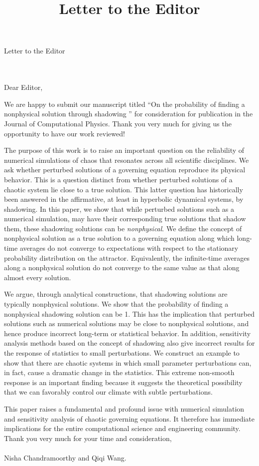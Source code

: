 \documentclass{letter}
\title{Letter to the Editor}
\begin{document}
\hspace{1.6in} 
\begin{large}{Letter to the Editor}\end{large}
\\
\\
Dear Editor,

We are happy to submit our manuscript titled 
``On the probability of finding a nonphysical solution through shadowing ''
for consideration for publication in the Journal of Computational Physics. Thank you very much for giving us the 
opportunity to have our work reviewed!

The purpose of this work is to raise an important question on the reliability of numerical simulations of chaos that resonates across all scientific disciplines. We ask whether perturbed solutions of a 
governing equation reproduce its physical behavior. This is a question distinct from whether perturbed solutions of a chaotic system lie close to a true solution. This latter question has historically been answered in the affirmative, at least in hyperbolic dynamical systems, by shadowing. In this paper, we show that while
perturbed solutions such as a numerical simulation, 
may have their corresponding true solutions that shadow them, these shadowing solutions can be \emph{nonphysical}. We define the concept of nonphysical solution as a true solution to a governing equation along which long-time averages do not converge to expectations with respect to the stationary probability distribution on the attractor. Equivalently, the infinite-time averages along a nonphysical solution do not converge to the same value as that along almost every solution.

We argue, through analytical constructions, that shadowing solutions are typically nonphysical solutions. We show that the probability of finding a nonphysical shadowing solution can be 1. This has the implication that perturbed solutions such as numerical solutions may be close to nonphysical solutions, and hence produce incorrect long-term or statistical behavior. In addition, sensitivity analysis methods based on the concept of shadowing also give incorrect results for the response of statistics to small perturbations. We construct an example to show that 
there are chaotic systems in which small parameter perturbations can, in fact, cause a dramatic change in the statistics. This extreme non-smooth response is an important finding because it suggests the theoretical possibility that we can favorably control our climate with subtle perturbations. 

This paper raises a fundamental and profound issue with numerical simulation and sensitivity analysis of chaotic governing equations. It therefore has immediate implications for the entire computational science and engineering community.
Thank you very much for your time and consideration,
\\
\\
Nisha Chandramoorthy and Qiqi Wang.
\end{document}
